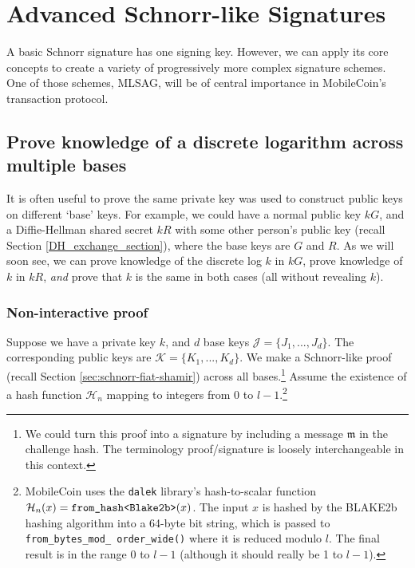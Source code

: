 \chapter{Advanced Schnorr-like Signatures}
\label{chapter:advanced-schnorr}

A basic Schnorr signature has one signing key. However, we can apply its core concepts to create a variety of progressively more complex signature schemes. One of those schemes, MLSAG, will be of central importance in MobileCoin's transaction protocol.



\section{Prove knowledge of a discrete logarithm across multiple bases}
\label{sec:proofs-discrete-logarithm-multiple-bases}

It is often useful to prove the same private key was used to construct public keys on different `base' keys. For example, we could have a normal public key $k G$, and a Diffie-Hellman shared secret $k R$ with some other person's public key (recall Section \ref{DH_exchange_section}), where the base keys are $G$ and $R$. As we will soon see, we can prove knowledge of the discrete log $k$ in $k G$, prove knowledge of $k$ in $k R$, {\em and} prove that $k$ is the same in both cases (all without revealing $k$).


\subsection*{Non-interactive proof}

Suppose we have a private key $k$, and $d$ base keys $\mathcal{J} = \{J_1,...,J_d\}$. The corresponding public keys are $\mathcal{K} = \{K_1,...,K_d\}$. We make a Schnorr-like proof (recall Section \ref{sec:schnorr-fiat-shamir}) across all bases.\footnote{We could turn this proof into a signature by including a message $\mathfrak{m}$ in the challenge hash. The terminology proof/signature is loosely interchangeable in this context.} Assume the existence of a hash function \(\mathcal{H}_n\) 
mapping to integers from 0 to $l-1$.\footnote{MobileCoin uses the {\tt dalek} library's hash-to-scalar function $\mathcal{H}_n(x) = \textrm{\tt from\_hash<Blake2b>}(x)$. The input $x$ is hashed by the BLAKE2b hashing algorithm \cite{blake2-paper} into a 64-byte bit string, which is passed to {\tt from\_bytes\_mod\_ order\_wide()} where it is reduced modulo $l$. The final result is in the range 0 to $l-1$ (although it should really be 1 to $l-1$).}

